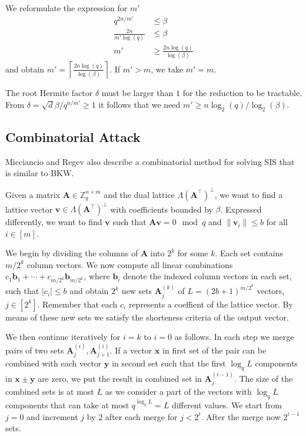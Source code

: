 We reformulate the expression for $m'$
\begin{align}
  q^{2n / m'}           & \leq \beta                          \nonumber \\
  \frac{2n}{m' \log(q)} & \leq \beta                          \nonumber \\
  m'                    & \geq \frac{2n \log(q)}{\log(\beta)}
\end{align}
and obtain $m' = \left\lceil \frac{2n \log(q)}{\log(\beta)} \right\rceil$. If $m' > m$, we take $m' = m$.

The root Hermite factor $\delta$ must be larger than $1$ for the reduction to be tractable. From $\delta = \sqrt{d}{\beta / q^{n/m'}} \geq 1$ it follows that we need $m' \geq n \log_2(q) / \log_2(\beta)$.



\subsection[Combinatorial Attack]{Combinatorial Attack \cite{MR09}}\label{sec:combinatorial}
Micciancio and Regev also describe a combinatorial method for solving SIS \cite{MR09} that is similar to BKW.

Given a matrix $\mathbf{A} \in \mathbb{Z}_q^{n \times m}$ and the dual lattice $\Lambda(\mathbf{A}^\intercal)^{\perp}$, we want to find a lattice vector $\mathbf{v} \in \Lambda(\mathbf{A}^\intercal)^{\perp}$ with coefficients bounded by $\beta$. Expressed differently, we want to find $\mathbf{v}$ such that $\mathbf{A}\mathbf{v} = 0 \mod q$ and $\|\mathbf{v}_i\| \leq b$ for all $i \in [m]$.

We begin by dividing the columns of $\mathbf{A}$ into $2^k$ for some $k$. Each set contains $m/2^k$ column vectors. We now compute all linear combinations $c_1 \mathbf{b}_1 + \cdots + c_{m/2^k}\mathbf{b}_{m/2^k}$, where $\mathbf{b}_i$ denote the indexed column vectors in each set, such that $|c_i| \leq b$ and obtain $2^k$ new sets $\mathbf{A}_j^{(k)}$ of $L=(2b+1)^{m/2^k}$ vectors, $j\in \left[2^k\right]$. Remember that each $c_i$ represents a coeffient of the lattice vector. By means of these new sets we satisfy the shorteness criteria of the output vector.

We then continue iteratively for $i=k$ to $i=0$ as follows. In each step we merge pairs of two sets $\mathbf{A}_j^{(i)}, \mathbf{A}_{j+1}^{(i)}$. If a vector $\mathbf{x}$ in first set of the pair can be combined with each vector $\mathbf{y}$ in second set such that the first $\log_q L$ components in $\mathbf{x} \pm \mathbf{y}$ are zero, we put the result in combined set in $\mathbf{A}_j^{(i-1)}$. The size of the combined sets is at most $L$ as we consider a part of the vectors with $\log_q L$ components that can take at most $q^{\log_q L} = L$ different values. We start from $j=0$ and increment $j$ by $2$ after each merge for $j<2^i$.
After the merge now $2^{i-1}$ sets.

